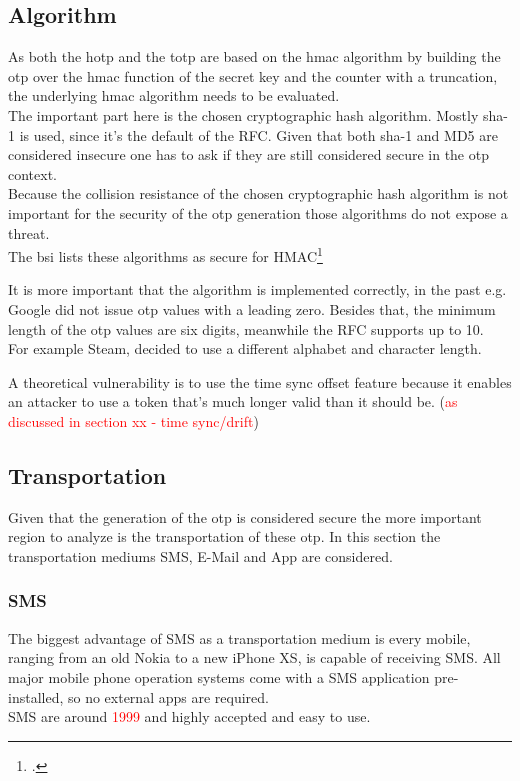 \subsection{Algorithm}

As both the \gls{hotp} and the \gls{totp} are based on the \gls{hmac} algorithm by building the \gls{otp} over the \gls{hmac} function of the secret key and the counter with a truncation, the underlying \gls{hmac} algorithm needs to be evaluated.\\
The important part here is the chosen cryptographic hash algorithm. Mostly \gls{sha}-1 is used, since it's the default of the RFC. Given that both \gls{sha}-1 and MD5 are considered insecure one has to ask if they are still considered secure in the \gls{otp} context.\\
Because the collision resistance of the chosen cryptographic hash algorithm is not important for the security of the \gls{otp} generation those algorithms do not expose a threat.\\
The \gls{bsi} lists these algorithms as secure for HMAC\footcite{verfahren2017empfehlungen}

It is more important that the algorithm is implemented correctly, in the past e.g. Google did not issue \gls{otp} values with a leading zero. Besides that, the minimum length of the \gls{otp} values are six digits, meanwhile the RFC supports up to 10.\\
For example Steam, decided to use a different alphabet and character length.

A theoretical vulnerability is to use the time sync offset feature because it enables an attacker to use a token that's much longer valid than it should be. (\textcolor{red}{as discussed in section xx - time sync/drift})

\subsection{Transportation}

Given that the generation of the \gls{otp} is considered secure the more important region to analyze is the transportation of these \gls{otp}. In this section the transportation mediums SMS, E-Mail and App are considered.

\subsubsection{SMS}

The biggest advantage of SMS as a transportation medium is every mobile, ranging from an old Nokia to a new iPhone XS, is capable of receiving SMS. All major mobile phone operation systems come with a SMS application pre-installed, so no external apps are required.\\
SMS are around \textcolor{red}{1999} and highly accepted and easy to use.

